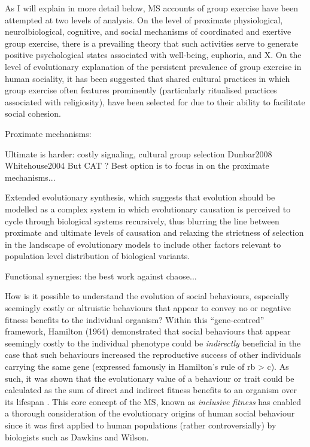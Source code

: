 As I will explain in more detail below, MS accounts of group exercise have been attempted at two levels of analysis.  On the level of proximate physiological, neurolbiological, cognitive, and social mechanisms of coordinated and exertive group exercise, there is a prevailing theory that such activities serve to generate positive psychological states associated with well-being, euphoria, and X. On the level of evolutionary explanation of the persistent prevalence of group exercise in human sociality, it has been suggested that shared cultural practices in which group exercise often features prominently (particularly ritualised practices associated with religiosity), have been selected for  due to their ability to facilitate social cohesion.




Proximate mechanisms:

Ultimate is harder:
costly signaling,
cultural group selection
    Dunbar2008
    Whitehouse2004
But CAT ?
Best option is to focus in on the proximate mechanisms...



Extended evolutionary synthesis,
which suggests that evolution should be modelled as a complex system in which evolutionary causation is perceived to cycle through biological systems recursively, thus blurring the line between proximate and ultimate levels of causation and relaxing the strictness of selection in the landscape of evolutionary models to include other factors relevant to population level distribution of biological variants.


Functional synergies: the best work against chaose...






How is it possible to understand the evolution of social behaviours, especially seemingly costly or altruistic behaviours that appear to convey no or negative fitness benefits to the individual organism? Within this ``gene-centred'' framework, Hamilton (1964) demonstrated that social behaviours that appear seemingly costly to the individual phenotype could be \textit{indirectly} beneficial in the case that such behaviours increased the reproductive success of other individuals carrying the same gene (expressed famously in Hamilton’s rule of rb > c).  As such, it was shown that the evolutionary value of a behaviour or trait could be calculated as the sum of direct and indirect fitness benefits to an organism over its lifespan \citep{Grafen2006}.  This core concept of the MS, known as \textit{inclusive fitness} has enabled a thorough consideration of the evolutionary origins of human social behaviour since it was first applied to human populations (rather controversially) by biologists such as Dawkins and Wilson.

